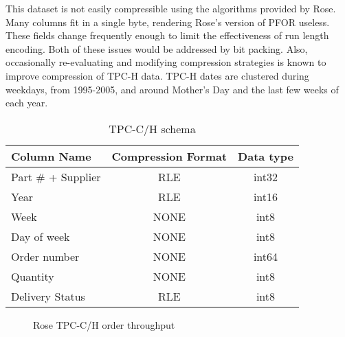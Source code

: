 \documentclass{vldb}
\newcommand{\rows}{Rose\xspace}
\newcommand{\rowss}{Rose's\xspace}
\begin{document}
This dataset is not easily compressible using the algorithms provided
by \rows.  Many columns fit in a single byte, rendering \rowss version
of PFOR useless.  These fields change frequently enough to limit the
effectiveness of run length encoding.  Both of these issues would be
addressed by bit packing.  Also, occasionally re-evaluating and modifying
compression strategies is known to improve compression of TPC-H data.
TPC-H dates are clustered during weekdays, from 1995-2005, and around
Mother's Day and the last few weeks of each year.

\begin{table}
\caption{TPC-C/H schema}
\centering
\label{tab:tpc-schema}
\begin{tabular}{|l|c|c|} \hline
Column Name     & Compression Format &  Data type\\ \hline
Part \# + Supplier & RLE       & int32              \\ \hline
Year            & RLE       & int16              \\\hline
Week            & NONE      & int8               \\\hline
Day of week     & NONE      & int8               \\\hline
Order number    & NONE      & int64              \\\hline
Quantity        & NONE      & int8               \\\hline
Delivery Status & RLE       & int8               \\\hline
\end{tabular}
\end{table}

\begin{figure}
\centering {}
\caption{\rows TPC-C/H order throughput}
\label{fig:tpch}
\end{figure}



\end{document}

